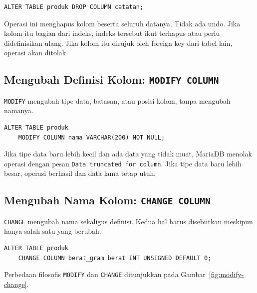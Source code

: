 \documentclass[11pt,a4paper]{article}
\begin{document}
\begin{lstlisting}[style=code]
ALTER TABLE produk DROP COLUMN catatan;
\end{lstlisting}

Operasi ini menghapus kolom beserta seluruh datanya. Tidak ada undo. Jika kolom itu bagian dari indeks, indeks tersebut ikut terhapus atau perlu didefinisikan ulang. Jika kolom itu dirujuk oleh foreign key dari tabel lain, operasi akan ditolak.

\subsection{Mengubah Definisi Kolom: \texttt{MODIFY COLUMN}}

\texttt{MODIFY} mengubah tipe data, batasan, atau posisi kolom, tanpa mengubah namanya.

\begin{lstlisting}[style=code]
ALTER TABLE produk
    MODIFY COLUMN nama VARCHAR(200) NOT NULL;
\end{lstlisting}

Jika tipe data baru lebih kecil dan ada data yang tidak muat, MariaDB menolak operasi dengan pesan \texttt{Data truncated for column}. Jika tipe data baru lebih besar, operasi berhasil dan data lama tetap utuh.

\subsection{Mengubah Nama Kolom: \texttt{CHANGE COLUMN}}

\texttt{CHANGE} mengubah nama sekaligus definisi. Kedua hal harus disebutkan meskipun hanya salah satu yang berubah.

\begin{lstlisting}[style=code]
ALTER TABLE produk
    CHANGE COLUMN berat_gram berat INT UNSIGNED DEFAULT 0;
\end{lstlisting}

Perbedaan filosofis \texttt{MODIFY} dan \texttt{CHANGE} ditunjukkan pada Gambar~\ref{fig:modify-change}.
\end{document}
